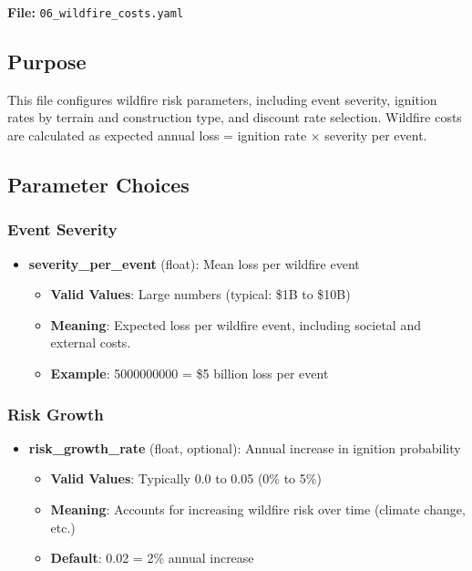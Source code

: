 \documentclass[ctcc_full_documentation.tex]{subfiles}
\begin{document}
\textbf{File:} \texttt{06\_wildfire\_costs.yaml}

\subsection{Purpose}

This file configures wildfire risk parameters, including event severity, ignition rates by terrain and construction type, and discount rate selection. Wildfire costs are calculated as expected annual loss = ignition rate × severity per event.

\subsection{Parameter Choices}

\subsubsection{Event Severity}

\begin{itemize}
    \item \textbf{severity\_per\_event} (float): Mean loss per wildfire event
    \begin{itemize}
        \item \textbf{Valid Values}: Large numbers (typical: \$1B to \$10B)
        \item \textbf{Meaning}: Expected loss per wildfire event, including societal and external costs.
        \item \textbf{Example}: 5000000000 = \$5 billion loss per event
    \end{itemize}
\end{itemize}

\subsubsection{Risk Growth}

\begin{itemize}
    \item \textbf{risk\_growth\_rate} (float, optional): Annual increase in ignition probability
    \begin{itemize}
        \item \textbf{Valid Values}: Typically 0.0 to 0.05 (0\% to 5\%)
        \item \textbf{Meaning}: Accounts for increasing wildfire risk over time (climate change, etc.)
        \item \textbf{Default}: 0.02 = 2\% annual increase
    \end{itemize}
\end{itemize}
\end{document}
